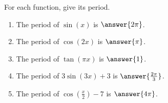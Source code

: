 \documentclass{ximera}
\author{Kenneth Berglund}
\begin{document}
\begin{exercise}
For each function, give its period.

\begin{enumerate}
\item The period of $\sin(x)$ is $\answer{2\pi}$.

\item The period of $\cos(2x)$ is $\answer{\pi}$.

\item The period of $\tan(\pi x)$ is $\answer{1}$.

\item The period of $3\sin(3x) + 3$ is $\answer{\frac{2\pi}{3}}$.

\item The period of $\cos\left(\frac{x}{2}\right) -7$ is $\answer{4\pi}$.
\end{enumerate}


\end{exercise}
\end{document}

